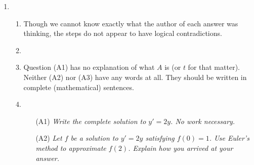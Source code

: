 
	
\begin{enumerate}
    \item \begin{enumerate}
        \item Though we cannot know exactly what the author of each answer was thinking, the steps do not appear to have logical contradictions.
        \item 
        \item Question (A1) has no explanation of what $A$ is (or $t$ for that matter). Neither (A2) nor (A3) have any words at all.
        They should be written in complete (mathematical) sentences.
        \item 

        \begin{enumerate}
            \item[(A1)] \emph{Write the complete solution to $y'=2y$. No work necessary.}


            \item[(A2)] \emph{Let $f$ be a solution to $y'=2y$ satisfying $f(0)=1$. Use Euler's method to approximate $f(2)$. Explain how you arrived at your answer.}
            


\end{enumerate}
\end{enumerate}
\end{enumerate}

